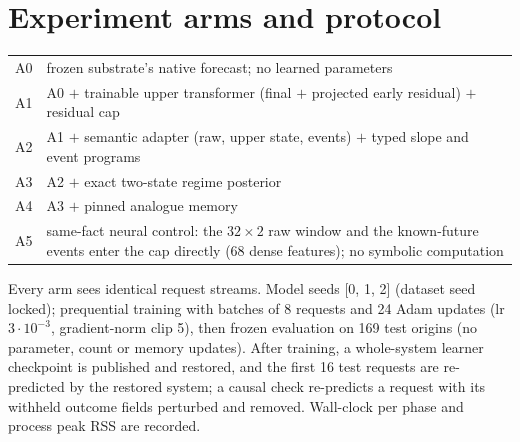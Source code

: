 \documentclass[10pt,a4paper]{article}
\begin{document}
\section{Experiment arms and protocol}
\begin{center}\small\begin{tabular}{@{}l p{11.8cm}@{}}\toprule
A0 & frozen substrate's native forecast; no learned parameters\\
A1 & A0 $+$ trainable upper transformer (final $+$ projected early residual) $+$ residual cap\\
A2 & A1 $+$ semantic adapter (raw, upper state, events) $+$ typed slope and event programs\\
A3 & A2 $+$ exact two-state regime posterior\\
A4 & A3 $+$ pinned analogue memory\\
A5 & same-fact neural control: the $32\times2$ raw window and the known-future events enter the cap directly (68 dense features); no symbolic computation\\
\bottomrule\end{tabular}\end{center}
Every arm sees identical request streams. Model seeds [0, 1, 2] (dataset seed locked); prequential training with batches of 8 requests and 24 Adam updates (lr $3\cdot10^{-3}$, gradient-norm clip 5), then frozen evaluation on 169 test origins (no parameter, count or memory updates). After training, a whole-system learner checkpoint is published and restored, and the first 16 test requests are re-predicted by the restored system; a causal check re-predicts a request with its withheld outcome fields perturbed and removed. Wall-clock per phase and process peak RSS are recorded.
\end{document}
